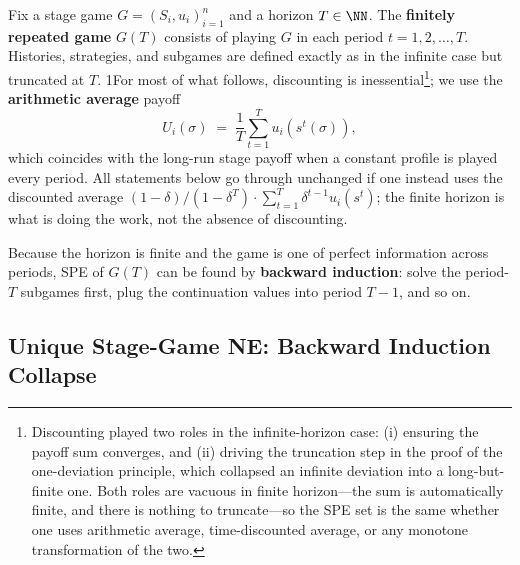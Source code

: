 Fix a stage game $G = (S_i, u_i)_{i=1}^n$ and a horizon $T \in \NN$. The \textbf{finitely repeated game} $G(T)$ consists of playing $G$ in each period $t = 1, 2, \ldots, T$. Histories, strategies, and subgames are defined exactly as in the infinite case but truncated at $T$. 1For most of what follows, discounting is inessential\footnote{
  Discounting played two roles in the infinite-horizon case: (i) ensuring the payoff sum converges, and (ii) driving the truncation step in the proof of the one-deviation principle, which collapsed an infinite deviation into a long-but-finite one. Both roles are vacuous in finite horizon---the sum is automatically finite, and there is nothing to truncate---so the SPE set is the same whether one uses arithmetic average, time-discounted average, or any monotone transformation of the two.
}; we use the \textbf{arithmetic average} payoff
\[
U_i(\sigma) \;=\; \frac{1}{T}\sum_{t=1}^{T} u_i\!\left(s^t(\sigma)\right),
\]
which coincides with the long-run stage payoff when a constant profile is played every period. All statements below go through unchanged if one instead uses the discounted average $(1-\delta)/(1-\delta^T) \cdot \sum_{t=1}^T \delta^{t-1} u_i(s^t)$; the finite horizon is what is doing the work, not the absence of discounting.

Because the horizon is finite and the game is one of perfect information across periods, SPE of $G(T)$ can be found by \textbf{backward induction}: solve the period-$T$ subgames first, plug the continuation values into period $T-1$, and so on.

\subsection{Unique Stage-Game NE: Backward Induction Collapse}


